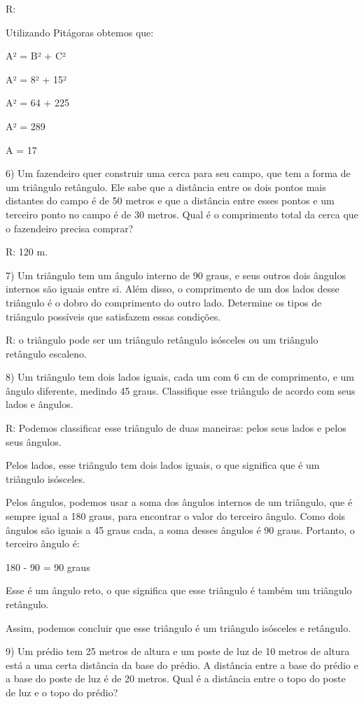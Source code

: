 R:

Utilizando Pitágoras obtemos que:

A² = B² + C²

A² = 8² + 15²

A² = 64 + 225

A² = 289

A = 17

6) Um fazendeiro quer construir uma cerca para seu campo, que tem a
forma de um triângulo retângulo. Ele sabe que a distância entre os dois
pontos mais distantes do campo é de 50 metros e que a distância entre
esses pontos e um terceiro ponto no campo é de 30 metros. Qual é o
comprimento total da cerca que o fazendeiro precisa comprar?

R: 120 m.

7) Um triângulo tem um ângulo interno de 90 graus, e seus outros dois
ângulos internos são iguais entre si. Além disso, o comprimento de um
dos lados desse triângulo é o dobro do comprimento do outro lado.
Determine os tipos de triângulo possíveis que satisfazem essas
condições.

R: o triângulo pode ser um triângulo retângulo isósceles ou um triângulo
retângulo escaleno.

8) Um triângulo tem dois lados iguais, cada um com 6 cm de comprimento,
e um ângulo diferente, medindo 45 graus. Classifique esse triângulo de
acordo com seus lados e ângulos.

R: Podemos classificar esse triângulo de duas maneiras: pelos seus lados
e pelos seus ângulos.

Pelos lados, esse triângulo tem dois lados iguais, o que significa que é
um triângulo isósceles.

Pelos ângulos, podemos usar a soma dos ângulos internos de um triângulo,
que é sempre igual a 180 graus, para encontrar o valor do terceiro
ângulo. Como dois ângulos são iguais a 45 graus cada, a soma desses
ângulos é 90 graus. Portanto, o terceiro ângulo é:

180 - 90 = 90 graus

Esse é um ângulo reto, o que significa que esse triângulo é também um
triângulo retângulo.

Assim, podemos concluir que esse triângulo é um triângulo isósceles e
retângulo.

9) Um prédio tem 25 metros de altura e um poste de luz de 10 metros de
altura está a uma certa distância da base do prédio. A distância entre a
base do prédio e a base do poste de luz é de 20 metros. Qual é a
distância entre o topo do poste de luz e o topo do prédio?

